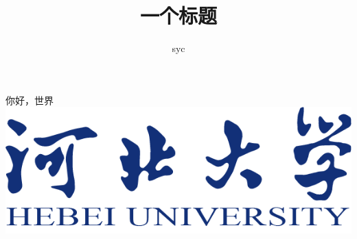 \documentclass[a4paper, 12pt]{book}
\title{一个标题}
\author{syc}
\begin{document}
\maketitle
\newpage
你好，世界
\includegraphics{hbu-title.png}
\end{document}
